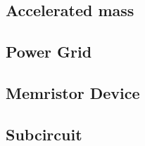 \subsection{Accelerated mass}


\clearpage
\subsection{Power Grid}


%

\clearpage
\subsection{Memristor Device}




\clearpage
\subsection{Subcircuit}
\label{SubcircuitInstance}




